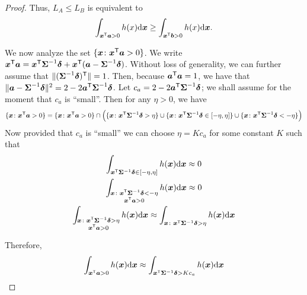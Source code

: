 \documentclass[10pt]{article}
\begin{document}
\begin{proof}
Thus, $L_A \leq L_B$ is equivalent to 
\begin{equation*}
\int_{\boldsymbol{x}^{\mathsf{T}} \boldsymbol{a} > 0} h(x) \mathrm{d} \boldsymbol{x} \geq \int_{\boldsymbol{x}^{\mathsf{T}} \boldsymbol{b} > 0} h(x) \mathrm{d} \boldsymbol{x}.
\end{equation*}

We now analyze the set $\{\boldsymbol{x} \colon \boldsymbol{x}^{\mathsf{T}} \boldsymbol{a} > 0\}$. We write 
$\boldsymbol{x}^{\mathsf{T}} \boldsymbol{a} = \boldsymbol{x}^{\mathsf{T}} \boldsymbol{\Sigma}^{-1} \boldsymbol{\delta} + \boldsymbol{x}^{\mathsf{T}} (\boldsymbol{a} - \boldsymbol{\Sigma}^{-1} \boldsymbol{\delta})$. 
Without loss of generality, we can further assume that $\|(\boldsymbol{\Sigma}^{-1} \boldsymbol{\delta})^{\mathsf{T}} \| = 1$. Then, because $\boldsymbol{a}^{\mathsf{T}} \boldsymbol{a} = 1$, we have that
$\|\boldsymbol{a} - \boldsymbol{\Sigma}^{-1} \boldsymbol{\delta} \|^{2} = 2 - 2 \boldsymbol{a}^{\mathsf{T}} \boldsymbol{\Sigma}^{-1} \boldsymbol{\delta}$. 
Let $c_a = 2 - 2 \boldsymbol{a}^{\mathsf{T}} \boldsymbol{\Sigma}^{-1} \boldsymbol{\delta}$; we shall assume for the moment that $c_a$ is ``small''. Then for any $\eta > 0$, we have
\begin{equation*}
\{\boldsymbol{x} \colon \boldsymbol{x}^{\mathsf{T}} \boldsymbol{a} > 0 \} = \{ \boldsymbol{x} \colon \boldsymbol{x}^{\mathsf{T}} \boldsymbol{a} > 0 \} \cap \Bigl(\{\boldsymbol{x} \colon \boldsymbol{x}^{\mathsf{T}} \boldsymbol{\Sigma}^{-1} \boldsymbol{\delta} > \eta \} \cup \{\boldsymbol{x} \colon \boldsymbol{x}^{\mathsf{T}} \boldsymbol{\Sigma}^{-1} \boldsymbol{\delta} \in [-\eta, \eta] \} \cup \{ \boldsymbol{x} \colon \boldsymbol{x}^{\mathsf{T}} \boldsymbol{\Sigma}^{-1} \boldsymbol{\delta} < -\eta \}\Bigr)
\end{equation*}
Now provided that $c_a$ is ``small'' we can choose $\eta = Kc_a$ for some constant $K$ such that 
\begin{gather}
\int_{\boldsymbol{x}^{\mathsf{T}} \boldsymbol{\Sigma}^{-1} \boldsymbol{\delta} \in [-\eta, \eta]} h(\boldsymbol{x}) \mathrm{d} \boldsymbol{x} \approx 0
\label{part:a}
\\
\int_{\substack{\boldsymbol{x} \colon \boldsymbol{x}^{\mathsf{T}} \boldsymbol{\Sigma}^{-1} \boldsymbol{\delta} < -\eta \\ \boldsymbol{x}^{\mathsf{T}} \boldsymbol{a} > 0 }} h(\boldsymbol{x}) \mathrm{d}\boldsymbol{x} \approx 0 
\label{part:b}
\\
 \int_{\substack{\boldsymbol{x} \colon \boldsymbol{x}^{\mathsf{T}} \boldsymbol{\Sigma}^{-1} \boldsymbol{\delta} > \eta \\ \boldsymbol{x}^{\mathsf{T}} \boldsymbol{a} > 0 }} h(\boldsymbol{x}) \mathrm{d}\boldsymbol{x} \approx 
\int_{\boldsymbol{x} \colon \boldsymbol{x}^{\mathsf{T}} \boldsymbol{\Sigma}^{-1} \boldsymbol{\delta} > \eta } h(\boldsymbol{x}) \mathrm{d} \boldsymbol{x}
\label{part:c}
\end{gather}

Therefore,
\begin{equation*}
\int_{\boldsymbol{x}^{\mathsf{T}} \boldsymbol{a} > 0} h(\boldsymbol{x}) \mathrm{d} \boldsymbol{x} \approx \int_{\boldsymbol{x}^{\mathsf{T}} \boldsymbol{\Sigma}^{-1} \boldsymbol{\delta} > K c_a} h(\boldsymbol{x}) \mathrm{d} \boldsymbol{x}
\end{equation*}


\end{proof}
\end{document}
